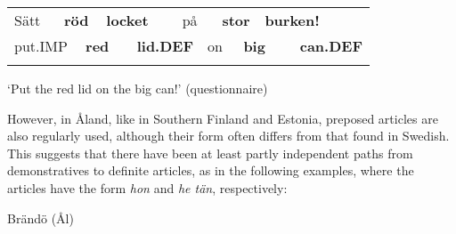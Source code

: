 \begin{tabular}{llllllllllll}
\lsptoprule
Sätt & \multicolumn{2}{l}{{\bfseries röd}

} & \multicolumn{2}{l}{{\bfseries locket}

} & \multicolumn{2}{l}{på

} & \multicolumn{2}{l}{{\bfseries stor}

} & \multicolumn{2}{l}{{\bfseries burken!}

} & \\
\multicolumn{2}{l}{put.IMP

} & \multicolumn{2}{l}{{\bfseries red}

} & \multicolumn{2}{l}{{\bfseries lid.DEF}

} & \multicolumn{2}{l}{on

} & \multicolumn{2}{l}{{\bfseries big}

} & \multicolumn{2}{l}{{\bfseries can.DEF}

}\\
\lspbottomrule
\end{tabular}

\begin{styleTranslation}
‘Put the red lid on the big can!’ (questionnaire)

\end{styleTranslation}

\begin{styleBodytextC}
However, in Åland, like in Southern Finland and Estonia, preposed articles are also regularly used, although their form often differs from that found in Swedish. This suggests that there have been at least partly independent paths from demonstratives to definite articles, as in the following examples, where the articles have the form \textit{hon} and \textit{he tän}, respectively:

\end{styleBodytextC}

\begin{listWWNumileveli}
\item {}

\begin{styleExample}
Brändö (Ål)

\end{styleExample}

\end{listWWNumileveli}

